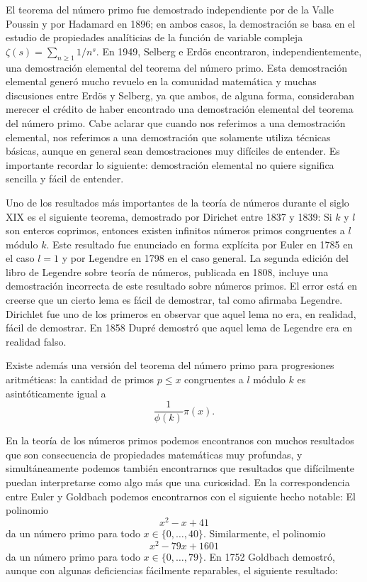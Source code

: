 El teorema del número primo fue demostrado independiente por de la Valle
Poussin y por Hadamard en 1896; en ambos casos, la demostración se basa en el
estudio de propiedades analíticias de la función de variable compleja
$\zeta(s)=\sum_{n\geq1}1/n^{s}$. En 1949, Selberg e Erd\"os encontraron,
independientemente, una demostración elemental del teorema del número primo.
Esta demostración elemental generó mucho revuelo en la comunidad matemática y
muchas discusiones entre Erd\"os y Selberg, ya que ambos, de alguna forma,
consideraban merecer el crédito de haber encontrado una demostración elemental
del teorema del número primo.  Cabe aclarar que cuando nos referimos a una
demostración elemental, nos referimos a una demostración que solamente utiliza
técnicas básicas, aunque en general sean demostraciones muy difíciles de
entender. Es importante recordar lo siguiente: demostración elemental no quiere
significa sencilla y fácil de entender. 

Uno de los resultados más importantes de la teoría de números durante el siglo
XIX es el siguiente teorema, demostrado por Dirichet entre 1837 y 1839: Si $k$
y $l$ son enteros coprimos, entonces existen infinitos números primos
congruentes a $l$ módulo $k$. 
Este resultado fue enunciado en forma explícita por Euler en 1785 en el caso
$l=1$ y por Legendre en 1798 en el caso general. La segunda edición del libro
de Legendre sobre teoría de números, publicada en 1808, incluye una
demostración incorrecta de este resultado sobre números primos. El error está
en creerse que un cierto lema es fácil de demostrar, tal como afirmaba
Legendre.  Dirichlet fue uno de los primeros en observar que aquel lema no era,
en realidad, fácil de demostrar. En 1858 Dupré demostró que aquel lema de
Legendre era en realidad falso.

Existe además una versión del teorema del número primo para progresiones
aritméticas: la cantidad de primos $p\leq x$ congruentes a $l$ módulo $k$ es
asintóticamente igual a 
\[
	\frac{1}{\phi(k)}\pi(x).
\]

En la teoría de los números primos podemos encontranos con muchos resultados
que son consecuencia de propiedades matemáticas muy profundas, y
simultáneamente podemos también encontrarnos que resultados que difícilmente
puedan interpretarse como algo más que una curiosidad.  En la correspondencia
entre Euler y Goldbach podemos encontrarnos con el siguiente hecho notable: El
polinomio 
\[
	x^2-x+41
\]
da un número primo para todo $x\in\{0,\dots,40\}$. Similarmente, el polinomio
\[
	x^2-79x+1601
\]
da un número primo para todo $x\in\{0,\dots,79\}$. En 1752 Goldbach demostró,
aunque con algunas deficiencias fácilmente reparables, el siguiente resultado:

